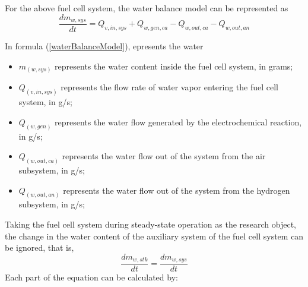 For the above fuel cell system, the water balance model can be represented as
\begin{equation} \label{waterBalanceModel}
	\frac{d m_{w,s y s}}{d t}=Q_{v,i n,s y s}+Q_{w,g e n,c a}-Q_{w,o u t,c a}-Q_{w,o u t,a n}
\end{equation}

In formula (\ref{waterBalanceModel}), epresents the water
\begin{itemize}
	\item $m_(w,sys)$ represents the water content inside the fuel cell system, in grams; %
	\item $Q_(v,in,sys)$ represents the flow rate of water vapor entering the fuel cell system, in g/s; %
	\item $Q_(w,gen)$ represents the water flow generated by the electrochemical reaction, in g/s; %
	\item $Q_(w,out,ca)$ represents the water flow out of the system from the air subsystem, in g/s; %
	\item $Q_(w,out,an)$ represents the water flow out of the system from the hydrogen subsystem, in g/s; %
\end{itemize}
Taking the fuel cell system during steady-state operation as the research object, the change in the water content of the auxiliary system of the fuel cell system can be ignored, that is,
\begin{equation}\label{changeInWaterContent}
	\frac{d m_{w,s t k}}{d t}=\frac{d m_{w,s y s}}{d t}
\end{equation}
Each part of the equation can be calculated by:
